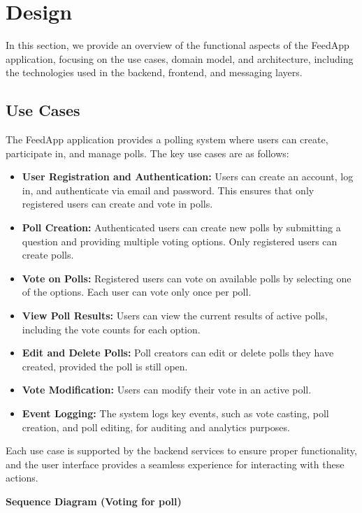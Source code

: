 \section{Design}
\label{sec:design}

\noindent
In this section, we provide an overview of the functional aspects of the FeedApp application, focusing on the use cases, domain model, and architecture, including the technologies used in the backend, frontend, and messaging layers.

\subsection{Use Cases}
The FeedApp application provides a polling system where users can create, participate in, and manage polls. The key use cases are as follows:
\begin{itemize}
    \item \textbf{User Registration and Authentication:} Users can create an account, log in, and authenticate via email and password. This ensures that only registered users can create and vote in polls.
    \item \textbf{Poll Creation:} Authenticated users can create new polls by submitting a question and providing multiple voting options. Only registered users can create polls.
    \item \textbf{Vote on Polls:} Registered users can vote on available polls by selecting one of the options. Each user can vote only once per poll.
    \item \textbf{View Poll Results:} Users can view the current results of active polls, including the vote counts for each option.
    \item \textbf{Edit and Delete Polls:} Poll creators can edit or delete polls they have created, provided the poll is still open.
    \item \textbf{Vote Modification:} Users can modify their vote in an active poll.
    \item \textbf{Event Logging:} The system logs key events, such as vote casting, poll creation, and poll editing, for auditing and analytics purposes.
\end{itemize}
Each use case is supported by the backend services to ensure proper functionality, and the user interface provides a seamless experience for interacting with these actions.

\vspace{1cm}
\noindent \textbf{Sequence Diagram (Voting for poll)}

